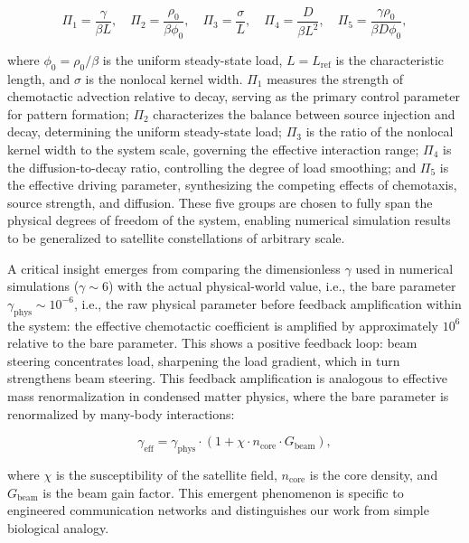 \documentclass[sn-nature,pdflatex]{sn-jnl}
\begin{document}
\begin{equation}
\label{eq:pi_groups}
\Pi_1 = \frac{\gamma}{\beta L},\quad
\Pi_2 = \frac{\rho_0}{\beta \phi_0},\quad
\Pi_3 = \frac{\sigma}{L},\quad
\Pi_4 = \frac{D}{\beta L^2},\quad
\Pi_5 = \frac{\gamma \rho_0}{\beta D \phi_0},
\end{equation}

where $\phi_0 = \rho_0/\beta$ is the uniform steady-state load, $L = L_{\text{ref}}$ is the characteristic length, and $\sigma$ is the nonlocal kernel width.
$\Pi_1$ measures the strength of chemotactic advection relative to decay, serving as the primary control parameter for pattern formation; $\Pi_2$ characterizes the balance between source injection and decay, determining the uniform steady-state load; $\Pi_3$ is the ratio of the nonlocal kernel width to the system scale, governing the effective interaction range; $\Pi_4$ is the diffusion-to-decay ratio, controlling the degree of load smoothing; and $\Pi_5$ is the effective driving parameter, synthesizing the competing effects of chemotaxis, source strength, and diffusion. These five groups are chosen to fully span the physical degrees of freedom of the system, enabling numerical simulation results to be generalized to satellite constellations of arbitrary scale.

A critical insight emerges from comparing the dimensionless $\gamma$ used in numerical simulations ($\gamma \sim 6$) with the actual physical-world value, i.e., the bare parameter $\gamma_{\text{phys}} \sim 10^{-6}$, i.e., the raw physical parameter before feedback amplification within the system: the effective chemotactic coefficient is amplified by approximately $10^6$ relative to the bare parameter.
This shows a positive feedback loop: beam steering concentrates load, sharpening the load gradient, which in turn strengthens beam steering.
This feedback amplification is analogous to effective mass renormalization in condensed matter physics, where the bare parameter is renormalized by many-body interactions:

\begin{equation}
\gamma_{\text{eff}} = \gamma_{\text{phys}} \cdot (1 + \chi \cdot n_{\text{core}} \cdot G_{\text{beam}}),
\end{equation}

where $\chi$ is the susceptibility of the satellite field, $n_{\text{core}}$ is the core density, and $G_{\text{beam}}$ is the beam gain factor.
This emergent phenomenon is specific to engineered communication networks and distinguishes our work from simple biological analogy.
\end{document}
